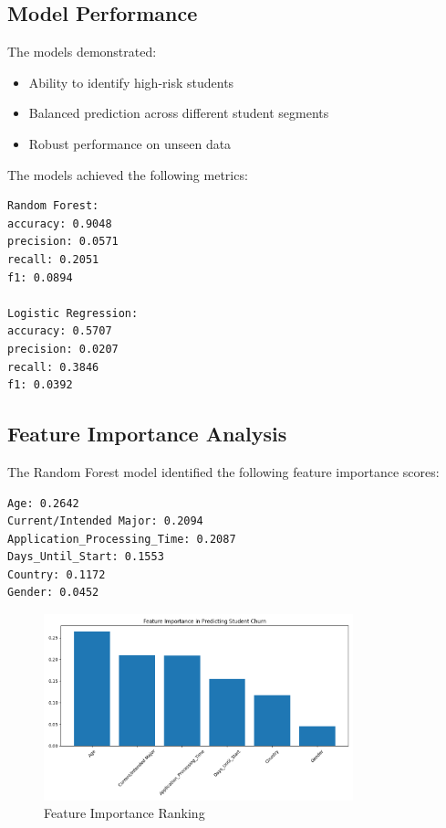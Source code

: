 \documentclass[12pt,a4paper]{article}
\begin{document}
\subsection{Model Performance}
The models demonstrated:
\begin{itemize}
    \item Ability to identify high-risk students
    \item Balanced prediction across different student segments
    \item Robust performance on unseen data
\end{itemize}

The models achieved the following metrics:

\begin{verbatim}
Random Forest:
accuracy: 0.9048
precision: 0.0571
recall: 0.2051
f1: 0.0894

Logistic Regression:
accuracy: 0.5707
precision: 0.0207
recall: 0.3846
f1: 0.0392
\end{verbatim}

\subsection{Feature Importance Analysis}
The Random Forest model identified the following feature importance scores:
\begin{verbatim}
Age: 0.2642
Current/Intended Major: 0.2094
Application_Processing_Time: 0.2087
Days_Until_Start: 0.1553
Country: 0.1172
Gender: 0.0452
\end{verbatim}

\begin{figure}[ht]
    \centering
    \includegraphics[width=0.8\textwidth]{../Code/images/feature_importance.png}
    \caption{Feature Importance Ranking}
    \label{fig:feature_importance}
\end{figure}
\end{document}
